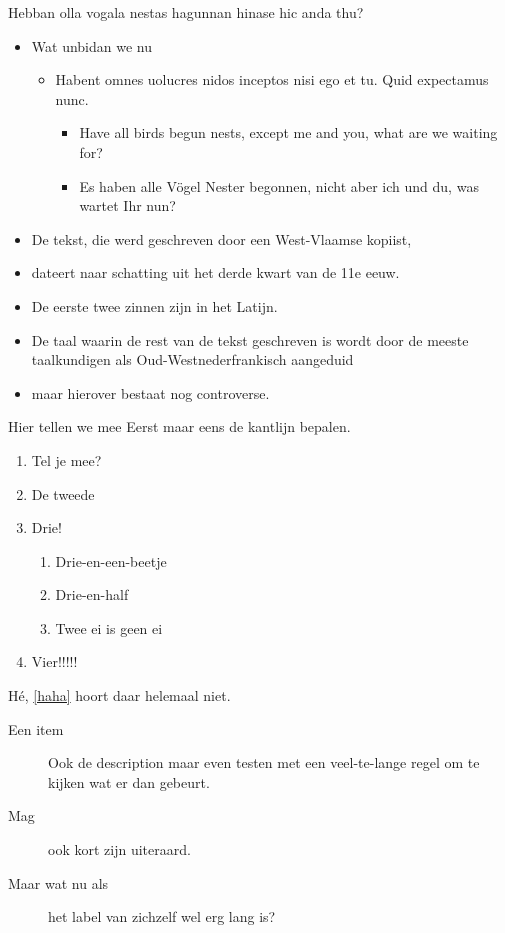 \documentclass[showdate=true, slidenumbers=relative]{beamerruhuisstijl169}
\begin{document}
\begin{frame}{Hebban olla vogala nestas hagunnan hinase hic anda thu?}
    \begin{itemize}
        \item Wat unbidan we nu
        \begin{itemize}
            \item Habent omnes uolucres nidos inceptos nisi ego et tu. Quid expectamus nunc.
            \begin{itemize}
                \item Have all birds begun nests, except me and you, what are we waiting for?
                \item Es haben alle V\"ogel Nester begonnen, nicht aber ich und du, was wartet Ihr nun?
            \end{itemize}
        \end{itemize}
        \item De tekst, die werd geschreven door een West-Vlaamse kopiist,
        \item dateert naar schatting uit het derde kwart van de 11e eeuw.
        \item  De eerste twee zinnen zijn in het Latijn.
        \item De taal waarin de rest van de tekst geschreven is wordt door de meeste taalkundigen als Oud-Westnederfrankisch aangeduid
        \item maar hierover bestaat nog controverse.
    \end{itemize}
\end{frame}

\begin{frame}{Hier tellen we mee}
    Eerst maar eens de kantlijn bepalen.
    \begin{enumerate}
        \item Tel je mee?
        \item De tweede
        \item Drie!
        \begin{enumerate}
            \item Drie-en-een-beetje
            \item Drie-en-half
            \item \label{haha} Twee ei is geen ei
        \end{enumerate}
        \item Vier!!!!!
    \end{enumerate}

    H\'e, \ref{haha} hoort daar helemaal niet.

    \begin{description}
        \item[Een item] Ook de description maar even testen met een veel-te-lange regel om te kijken wat er dan gebeurt.
        \item[Mag] ook kort zijn uiteraard.
        \item[Maar wat nu als] het label van zichzelf wel erg lang is?
    \end{description}
\end{frame}
\end{document}
